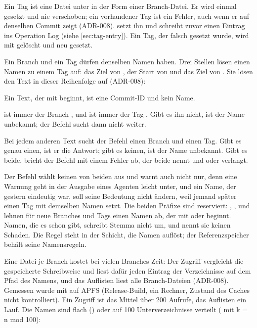 Ein Tag ist eine Datei unter  in der Form einer Branch-Datei.
Er wird einmal gesetzt und nie verschoben; ein vorhandener Tag ist ein Fehler,
auch wenn er auf denselben Commit zeigt (ADR-008).
 setzt ihn und schreibt zuvor einen Eintrag ins Operation Log
(siehe [sec:tag-entry]).
Ein Tag, der falsch gesetzt wurde, wird mit  gelöscht und neu gesetzt.

Ein Branch und ein Tag dürfen denselben Namen haben.
Drei Stellen lösen einen Namen zu einem Tag auf: das Ziel von ,
der Start von  und das Ziel von .
Sie lösen den Text in dieser Reihenfolge auf (ADR-008):

\startitemize[n]
\item Ein Text, der mit  beginnt, ist eine Commit-ID und kein Name.
\item {} ist immer der Branch , und  ist immer der Tag .
Gibt es ihn nicht, ist der Name unbekannt; der Befehl sucht dann nicht weiter.
\item Bei jedem anderen Text sucht der Befehl einen Branch und einen Tag.
Gibt es genau einen, ist er die Antwort; gibt es keinen, ist der Name unbekannt.
Gibt es beide, bricht der Befehl mit einem Fehler ab,
der beide nennt und  oder  verlangt.
\stopitemize

Der Befehl wählt keinen von beiden aus und warnt auch nicht nur,
denn eine Warnung geht in der Ausgabe eines Agenten leicht unter,
und ein Name, der gestern eindeutig war, soll seine Bedeutung nicht ändern,
weil jemand später einen Tag mit demselben Namen setzt.
Die beiden Präfixe sind reserviert: , ,  und
 lehnen für neue Branches und Tags einen Namen ab,
der mit  oder  beginnt.
Namen, die es schon gibt, schreibt Stemma nicht um, und  nennt sie keinen Schaden.
Die Regel steht in der Schicht, die Namen auflöst; der Referenzspeicher behält seine Namensregeln.

Eine Datei je Branch kostet bei vielen Branches Zeit: Der Zugriff vergleicht die
gespeicherte Schreibweise und liest dafür jeden Eintrag der Verzeichnisse auf dem Pfad
des Namens, und das Auflisten liest alle Branch-Dateien (ADR-008).
Gemessen wurde mit  auf APFS (Release-Build, ein Rechner, Zustand des Caches
nicht kontrolliert). Ein Zugriff ist das Mittel über 200 Aufrufe, das Auflisten ein Lauf.
Die Namen sind flach () oder auf 100 Unterverzeichnisse verteilt
( mit k = n mod 100):

